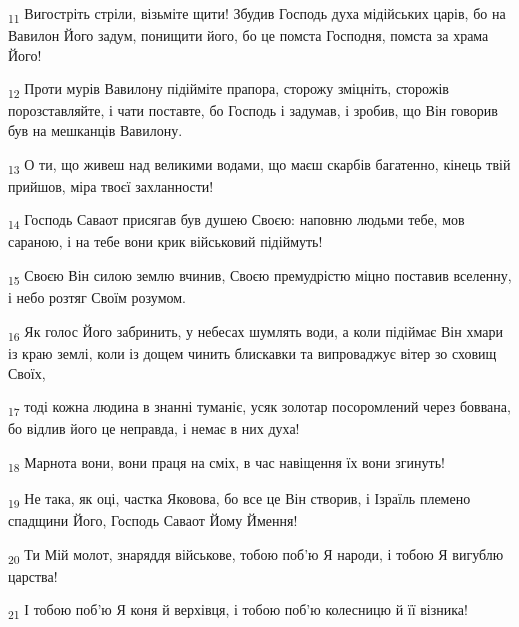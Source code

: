 \begin{tcolorbox}
\textsubscript{11} Вигостріть стріли, візьміте щити! Збудив Господь духа мідійських царів, бо на Вавилон Його задум, понищити його, бо це помста Господня, помста за храма Його!
\end{tcolorbox}
\begin{tcolorbox}
\textsubscript{12} Проти мурів Вавилону підійміте прапора, сторожу зміцніть, сторожів порозставляйте, і чати поставте, бо Господь і задумав, і зробив, що Він говорив був на мешканців Вавилону.
\end{tcolorbox}
\begin{tcolorbox}
\textsubscript{13} О ти, що живеш над великими водами, що маєш скарбів багатенно, кінець твій прийшов, міра твоєї захланности!
\end{tcolorbox}
\begin{tcolorbox}
\textsubscript{14} Господь Саваот присягав був душею Своєю: наповню людьми тебе, мов сараною, і на тебе вони крик військовий підіймуть!
\end{tcolorbox}
\begin{tcolorbox}
\textsubscript{15} Своєю Він силою землю вчинив, Своєю премудрістю міцно поставив вселенну, і небо розтяг Своїм розумом.
\end{tcolorbox}
\begin{tcolorbox}
\textsubscript{16} Як голос Його забринить, у небесах шумлять води, а коли підіймає Він хмари із краю землі, коли із дощем чинить блискавки та випроваджує вітер зо сховищ Своїх,
\end{tcolorbox}
\begin{tcolorbox}
\textsubscript{17} тоді кожна людина в знанні туманіє, усяк золотар посоромлений через боввана, бо відлив його це неправда, і немає в них духа!
\end{tcolorbox}
\begin{tcolorbox}
\textsubscript{18} Марнота вони, вони праця на сміх, в час навіщення їх вони згинуть!
\end{tcolorbox}
\begin{tcolorbox}
\textsubscript{19} Не така, як оці, частка Яковова, бо все це Він створив, і Ізраїль племено спадщини Його, Господь Саваот Йому Ймення!
\end{tcolorbox}
\begin{tcolorbox}
\textsubscript{20} Ти Мій молот, знаряддя військове, тобою поб'ю Я народи, і тобою Я вигублю царства!
\end{tcolorbox}
\begin{tcolorbox}
\textsubscript{21} І тобою поб'ю Я коня й верхівця, і тобою поб'ю колесницю й її візника!
\end{tcolorbox}
